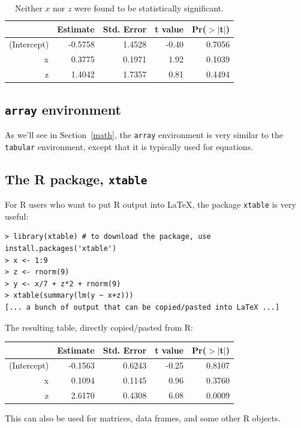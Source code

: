 \documentclass[11pt]{article} %
\begin{document}
\begin{table}[ht]
\begin{center}
\begin{tabular}{rrrrr}
  \hline
 & Estimate & Std. Error & t value & Pr($>$$|$t$|$) \\
  \hline
(Intercept) & -0.5758 & 1.4528 & -0.40 & 0.7056 \\
  x & 0.3775 & 0.1971 & 1.92 & 0.1039 \\
  z & 1.4042 & 1.7357 & 0.81 & 0.4494 \\
   \hline
\end{tabular}
\end{center}
\caption{Neither $x$ nor $z$ were found to be statistically significant.}
\label{multRegression} %
\end{table}

\subsection{\texttt{array} environment}

As we'll see in Section~\ref{math}, the \texttt{array} environment is very similar to the \texttt{tabular} environment, except that it is typically used for equations.

\subsection{The R package, \texttt{xtable}}

For R users who want to put R output into LaTeX, the package \texttt{xtable} is very useful:
\begin{verbatim}
> library(xtable) # to download the package, use install.packages('xtable')
> x <- 1:9
> z <- rnorm(9)
> y <- x/7 + z*2 + rnorm(9)
> xtable(summary(lm(y ~ x+z)))
[... a bunch of output that can be copied/pasted into LaTeX ...]
\end{verbatim}
The resulting table, directly copied/pasted from R:
\begin{table}[ht]
\begin{center}
\begin{tabular}{rrrrr}
  \hline
 & Estimate & Std. Error & t value & Pr($>$$|$t$|$) \\
  \hline
(Intercept) & -0.1563 & 0.6243 & -0.25 & 0.8107 \\
  x & 0.1094 & 0.1145 & 0.96 & 0.3760 \\
  z & 2.6170 & 0.4308 & 6.08 & 0.0009 \\
   \hline
\end{tabular}
\end{center}
\end{table}
This can also be used for matrices, data frames, and some other R objects.
\end{document}
